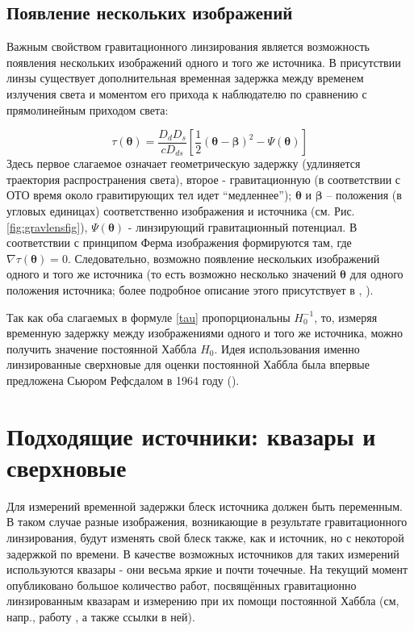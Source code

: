 \subsection{Появление нескольких изображений}

Важным свойством гравитационного линзирования является возможность появления нескольких изображений одного и того же источника. В присутствии линзы существует дополнительная временная задержка между временем излучения света и моментом его прихода к наблюдателю по сравнению с прямолинейным приходом света:

\begin{equation}\label{tau}
\tau(\boldsymbol{\theta})=\frac{D_{d} D_{s}}{c D_{d s}}\left[\frac{1}{2}(\boldsymbol{\theta}-\boldsymbol{\beta})^{2}-\Psi(\boldsymbol{\theta})\right]
\end{equation}
Здесь первое слагаемое означает геометрическую задержку (удлиняется траектория распространения света), второе - гравитационную (в соответствии с ОТО время около гравитирующих тел идет “медленнее”); $\boldsymbol{\theta}$ и $\boldsymbol{\beta}$ -- положения (в угловых единицах) соответственно изображения и источника (см. Рис.\ref{fig:gravlensfig}), $\Psi(\boldsymbol{\theta})$ - линзирующий гравитационный потенциал. В соответствии с принципом Ферма изображения формируются там, где $\nabla \tau (\boldsymbol{\theta}) = 0$. Следовательно, возможно появление нескольких изображений  одного и того же источника (то есть возможно несколько значений $\boldsymbol{\theta}$ для одного положения источника; более подробное описание этого присутствует в \cite{gravlensbook}, \cite{gl_all}).

Так как оба слагаемых в формуле \eqref{tau} пропорциональны $H_0^{-1}$, то, измеряя временную задержку между изображениями одного и того же источника, можно получить значение постоянной Хаббла $H_0$. Идея использования именно линзированные сверхновые для оценки постоянной Хаббла была впервые предложена Сьюром Рефсдалом в 1964 году (\cite{refsdal1964}).

\section{Подходящие источники: квазары и сверхновые}

Для измерений временной задержки блеск источника должен быть переменным. В таком случае разные изображения, возникающие в результате гравитационного линзирования, будут изменять свой блеск также, как и источник, но с некоторой задержкой по времени. В качестве возможных источников для таких измерений используются квазары - они весьма яркие и почти точечные. На текущий момент опубликовано большое количество работ, посвящённых гравитационно линзированным квазарам и измерению при их помощи постоянной Хаббла (см, напр., работу \cite{holicow}, а также ссылки в ней). 

